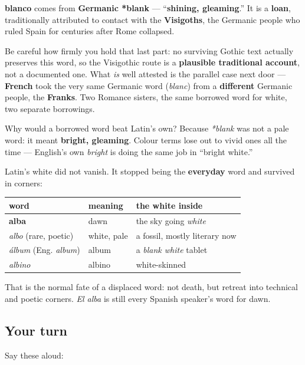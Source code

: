 \begin{cousinweb}
\textbf{blanco} comes from \textbf{Germanic *blank} — \textquotedblleft{}\textbf{shining, gleaming}.\textquotedblright{} It is a \textbf{loan}, traditionally attributed to contact with the \textbf{Visigoths}, the Germanic people who ruled Spain for centuries after Rome collapsed.

Be careful how firmly you hold that last part: no surviving Gothic text actually preserves this word, so the Visigothic route is a \textbf{plausible traditional account}, not a documented one. What \emph{is} well attested is the parallel case next door — \textbf{French} took the very same Germanic word (\emph{blanc}) from a \textbf{different} Germanic people, the \textbf{Franks}. Two Romance sisters, the same borrowed word for white, two separate borrowings.

Why would a borrowed word beat Latin's own? Because \emph{*blank} was not a pale word: it meant \textbf{bright, gleaming}. Colour terms lose out to vivid ones all the time — English's own \emph{bright} is doing the same job in \textquotedblleft{}bright white.\textquotedblright{}
\end{cousinweb}

\begin{culture}
Latin's white did not vanish. It stopped being the \textbf{everyday} word and survived in corners:

\noindent
\begin{tabularx}{\linewidth}{@{}>{\raggedright\arraybackslash}X>{\raggedright\arraybackslash}X>{\raggedright\arraybackslash}X@{}}
\toprule
\textbf{word} & \textbf{meaning} & \textbf{the white inside} \\
\midrule
\textbf{alba} & dawn & the sky going \emph{white} \\
\emph{albo} (rare, poetic) & white, pale & a fossil, mostly literary now \\
\emph{álbum} (Eng. \emph{album}) & album & a \emph{blank white} tablet \\
\emph{albino} & albino & white-skinned \\
\bottomrule
\end{tabularx}

That is the normal fate of a displaced word: not death, but retreat into technical and poetic corners. \emph{El alba} is still every Spanish speaker's word for dawn.
\end{culture}

\subsection*{Your turn}
Say these aloud:

